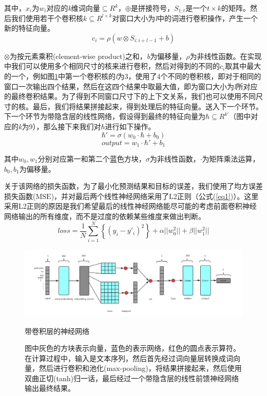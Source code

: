 其中，\(x_i\)为\(w_i\)对应的\textit{k}维词向量\(\subseteq R^k\)，\(\oplus\)是拼接符号，\(S_{1:t}\)是一个\(t\times k\)的矩阵。然后我们使用若干个卷积核\(k\subseteq R^{l\times k}\)对窗口大小为\textit{l}中的词进行卷积操作，产生一个新的特征向量。
\begin{equation}
c_i=\rho(w\otimes S_{i:i+l-1}+b)
\end{equation}

\(\otimes\)为按元素乘积(element-wise product)之和，\textit{b}为偏移量，\(\rho\)为非线性函数。在实现中我们可以使用多个相同尺寸的核来进行卷积，然后对得到的不同的\(c_i\)取其中最大的一个，例如图\ref{f21}中第一个卷积核的\textit{l}为3，使用了4个不同的卷积核，即对于相同的窗口一次输出四个结果，然后在这四个结果中取最大值，即为窗口大小为\textit{l}所对应的最终卷积结果。为了得到不同窗口尺寸下的上下文关系，我们也可以使用不同尺寸的核。最后，我们将结果拼接起来，得到处理后的特征向量。送入下一个环节。下一个环节为带隐含层的线性网络，假设得到最终的特征向量为\(\hbar\subseteq R^{k'}\)（图中对应的\textit{k}为9），那么接下来我们对\(\hbar\)进行如下操作。
\begin{equation}
\hbar'=\sigma(w_0\cdot\hbar+b_0)
\end{equation}
\begin{equation}
output = w_1\cdot\hbar'+b_1
\end{equation}

其中\(w_0,w_1\)分别对应第一和第二个蓝色方块，\(\sigma\)为非线性函数，\(\cdot\)为矩阵乘法运算，\(b_0,b_1\)为偏移量。

关于该网络的损失函数，为了最小化预测结果和目标的误差，我们使用了均方误差损失函数($\mathrm{MSE}$)，并对最后两个线性神经网络采用了L2正则（公式(\ref{eq1})）。这里采用L2正则的原因是我们希望最后的线性神经网络能尽可能的考虑前面卷积神经网络输出的所有维度，而不是过度的依赖某些维度来做出判断。
\begin{equation}\label{eq1}
loss=\frac{1}{N}\displaystyle\sum_{i=1}^{N}\left\{(y_i-y'_i)^2\right\}+\alpha||w_0^2||+\beta||w_1^2||
\end{equation}
\begin{figure}[htbp]
    \centering
    \includegraphics[width=16cm]{conv_ranker.png}
    \caption{带卷积层的神经网络}
    \captionsetup{font=footnotesize,margin=30pt}\caption*{图中灰色的方块表示向量，蓝色的表示网络，红色的圆点表示算符。在计算过程中，输入是文本序列，然后首先经过词向量层转换成词向量，然后进行卷积和池化(max-pooling)，将结果拼接起来，然后使用双曲正切(tanh)归一话，最后经过一个带隐含层的线性前馈神经网络输出最终结果。}
    \label{f21}
\end{figure} 

